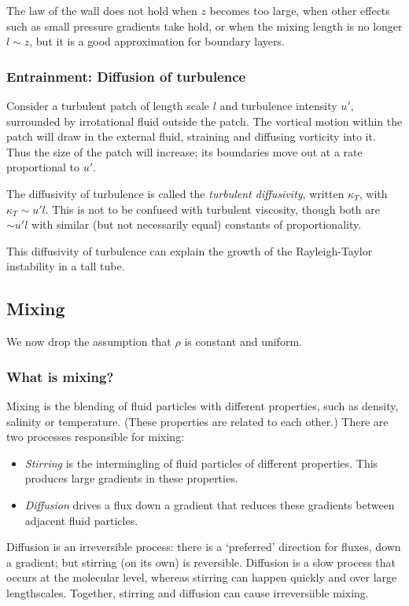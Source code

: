 The law of the wall does not hold when $z$ becomes too large, when other effects
such as small pressure gradients take hold, or when the mixing length is no
longer $l\sim z$, but it is a good approximation for boundary layers. 

\subsubsection{Entrainment: Diffusion of turbulence}

Consider a turbulent patch of length scale $l$ and turbulence intensity $u'$,
surrounded by irrotational fluid outside the patch. The vortical motion within
the patch will draw in the external fluid, straining and diffusing vorticity
into it. Thus the size of the patch will increase; its boundaries move out at a
rate proportional to $u'$. 

The diffusivity of turbulence is called the \textit{turbulent diffusivity},
written $\kappa_T$, with $\kappa_T \sim u'l$. This is not to be confused with
turbulent viscosity, though both are $\sim u'l$ with similar (but not
necessarily equal) constants of proportionality.

This diffusivity of turbulence can explain the growth of the Rayleigh-Taylor
instability in a tall tube. 

\subsection{Mixing}

We now drop the assumption that $\rho$ is constant and uniform.

\subsubsection{What is mixing?}

Mixing is the blending of fluid particles with different properties, such as
density, salinity or temperature. (These properties are related to each other.)
There are two processes responsible for mixing:
\begin{itemize}
    \item \textit{Stirring} is the intermingling of fluid particles of different
        properties. This produces large gradients in these properties.
    \item \textit{Diffusion} drives a flux down a gradient that reduces these
        gradients between adjacent fluid particles.
\end{itemize}
Diffusion is an irreversible process: there is a `preferred' direction for
fluxes, down a gradient; but stirring (on its own) is reversible. Diffusion is a
slow process that occurs at the molecular level, whereas stirring can happen
quickly and over large lengthscales. Together, stirring and diffusion can cause
irreversiible mixing.

